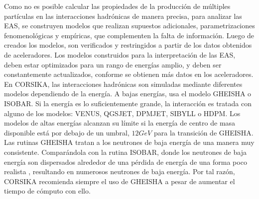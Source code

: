 Como no es posible calcular las  propiedades de la producción de múltiples partículas en las interacciones hadrónicas de manera precisa, para analizar las EAS, se construyen modelos que realizan supuestos adicionales, parametrizaciones fenomenológicas y empíricas, que complementen la falta de información. Luego de creados los modelos, son verificados y restringidos a partir de los datos obtenidos de aceleradores. Los modelos construidos para la interpretación de las EAS, deben estar optimizados para un rango de energías amplio, y deben ser constantemente actualizados, conforme se obtienen más datos en los aceleradores.\\

En CORSIKA, las interacciones hadrónicas son simuladas mediante diferentes modelos dependiendo de la energía. A bajas energías, usa el modelo GHEISHA o ISOBAR. Si la energía es lo suficientemente grande, la interacción es tratada con alguno de los modelos: VENUS, QGSJET, DPMJET, SIBYLL o HDPM. Los modelos de altas energías  alcanzan su límite si la energía de centro de masa disponible está por debajo de  un umbral, $12 GeV$ para la transición de GHEISHA. \\

Las rutinas GHEISHA tratan a los neutrones de baja energía de una manera muy consistente. Comparándola con la rutina ISOBAR, donde los neutrones de baja energía son dispersados alrededor de una pérdida de energía de una forma poco realista \cite{Allen}, resultando en numerosos neutrones de baja energía. Por tal razón, CORSIKA recomienda siempre el uso de GHEISHA a pesar de aumentar el tiempo de cómputo con ello.\\

